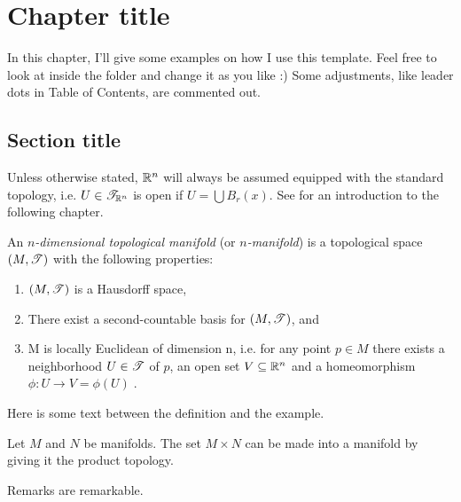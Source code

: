 \chapter{Chapter title}

In this chapter, I'll give some examples on how I use this template. Feel free to look at  inside the  folder and change it as you like :) Some adjustments, like leader dots in Table of Contents, are commented out.


\section{Section title}
\label{sec:sec_title}


Unless otherwise stated, \(\mathbb{R}^n\) will always be assumed equipped with the standard topology, i.e. \(U \in \mathscr{T}_{\mathbb{R}^n}\) is open if \(U = \bigcup B_r(x)\). See \cite{Lee2013} for an introduction to the following chapter. 

\begin{mydef}
    \label{def:manifold} 
   An \emph{$n$-dimensional topological manifold} (or \emph{$n$-manifold}) is a topological space $(M, \mathscr{T})$ with the following properties:
    \begin{enumerate}
         \item \((M, \mathscr{T})\) is a Hausdorff space,
         \item There exist a second-countable basis for \((M, \mathscr{T})\), and
         \item M is locally Euclidean of dimension n, i.e. for any point $p\in M$ there exists a neighborhood $U\in\mathscr{T}$ of $p$, an open set $V\subseteq\mathbb{R}^n$ and a homeomorphism $\phi:U \to  V=\phi(U) \;$.
    \end{enumerate}
\end{mydef}

Here is some text between the definition and the example.

\begin{ex}
    \label{ex:manifold}
    Let $M$ and $N$ be manifolds. The set $M\times N$ can be made into a manifold by giving it the product topology.
\end{ex}

\begin{remark}
    Remarks are remarkable.
\end{remark}

